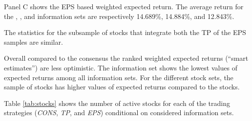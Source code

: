 \documentclass[a4paper,12pt,openright,notitlepage]{report}\usepackage[]{graphicx}\usepackage[]{color}
\begin{document}
Panel C shows the EPS based weighted expected return. The average return for the \tr{}, \naive{}, and  information sets are respectively 14.689\%, 14.884\%, and 12.843\%.


The statistics for the subsample of stocks that integrate both the TP of the EPS samples are similar.


Overall compared to the consensus the ranked weighted expected returns (``smart estimates'') are less optimistic. The  information set shows the lowest values of expected returns among all information sets. For the different stock sets,  the \same{} sample of stocks has higher values of expected returns compared to the \all{} stocks.

Table \ref{tab:stocks} shows the number of active stocks for each of the trading strategies (\textit{CONS}, \textit{TP}, and \textit{EPS}) conditional on considered information sets.
\end{document}
